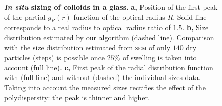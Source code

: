 \documentclass[8.5pt,twoside,twocolumn]{article}
\begin{document}
\begin{figure}
	\caption{\textbf{\emph{In situ} sizing of colloids in a glass.} \textbf{a,} Position of the first peak of the partial $g_R(r)$ function of the optical radius $R$. Solid line corresponds to a real radius to optical radius ratio of $1.5$. \textbf{b,} Size distribution estimated by our algorithm (dashed line). Comparison with the size distribution estimated from \textsc{sem} of only $140$ dry particles (steps) is possible once $25\%$ of swelling is taken into account (full line). \textbf{c,} First peak of the radial distribution function with (full line) and without (dashed) the individual sizes data. Taking into account the measured sizes rectifies the effect of the polydispersity: the peak is thinner and higher.}
	\label{fig:sizing}
\end{figure}
\end{document}
